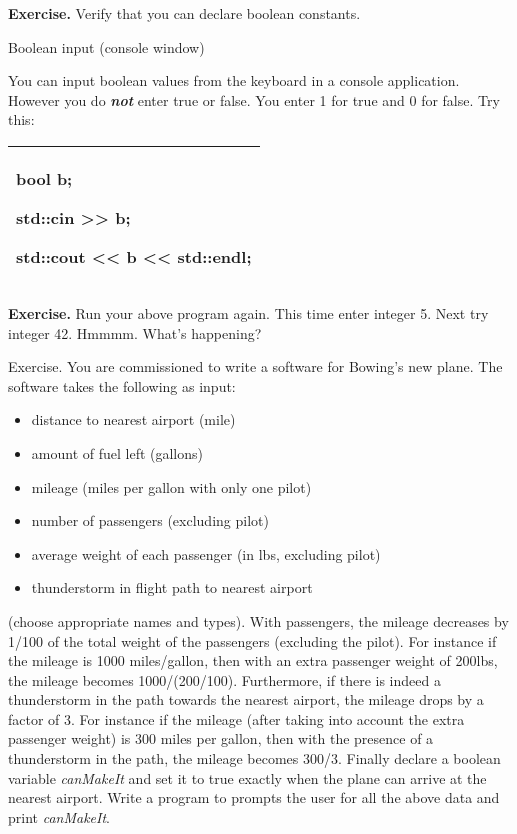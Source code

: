 \documentclass[
]{article}
\providecommand{\tightlist}{%
  \setlength{\itemsep}{0pt}\setlength{\parskip}{0pt}}
\begin{document}
\textbf{Exercise.} Verify that you can declare boolean constants.

Boolean input (console window)

You can input boolean values from the keyboard in a console application.
However you do \emph{\textbf{not}} enter true or false. You enter 1 for
true and 0 for false.\textbf{ }Try this:

\begin{longtable}[]{@{}l@{}}
\toprule
\endhead
\begin{minipage}[t]{0.97\columnwidth}\raggedright
bool b;

std::cin \textgreater\textgreater{} b;

std::cout \textless\textless{} b \textless\textless{} std::endl;\strut
\end{minipage}\tabularnewline
\bottomrule
\end{longtable}

\textbf{Exercise.} Run your above program again. This time enter integer
5. Next try integer 42. Hmmmm. What's happening?

Exercise. You are commissioned to write a software for Bowing's new
plane. The software takes the following as input:

\begin{itemize}
\tightlist
\item
  distance to nearest airport (mile)
\item
  amount of fuel left (gallons)
\item
  mileage (miles per gallon with only one pilot)
\item
  number of passengers (excluding pilot)
\item
  average weight of each passenger (in lbs, excluding pilot)
\item
  thunderstorm in flight path to nearest airport
\end{itemize}

(choose appropriate names and types). With passengers, the mileage
decreases by 1/100 of the total weight of the passengers (excluding the
pilot). For instance if the mileage is 1000 miles/gallon, then with an
extra passenger weight of 200lbs, the mileage becomes 1000/(200/100).
Furthermore, if there is indeed a thunderstorm in the path towards the
nearest airport, the mileage drops by a factor of 3. For instance if the
mileage (after taking into account the extra passenger weight) is 300
miles per gallon, then with the presence of a thunderstorm in the path,
the mileage becomes 300/3. Finally declare a boolean variable
\emph{canMakeIt} and set it to true exactly when the plane can arrive at
the nearest airport. Write a program to prompts the user for all the
above data and print \emph{canMakeIt}.
\end{document}
